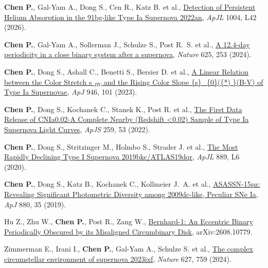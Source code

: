 
\item \textbf{Chen P.}, Gal-Yam A., Dong S., Cen R., Katz B. et al., \href{https://ui.adsabs.harvard.edu/abs/2026ApJ..1004L..42C}{Detection of Persistent Helium Absorption in the 91bg-like Type Ia Supernova 2022an}, \textit{ApJL} 1004, L42 (2026).

\item \textbf{Chen P.}, Gal-Yam A., Sollerman J., Schulze S., Post R.~S. et al., \href{https://ui.adsabs.harvard.edu/abs/2024Natur.625..253C}{A 12.4-day periodicity in a close binary system after a supernova}, \textit{Nature} 625, 253 (2024).

\item \textbf{Chen P.}, Dong S., Ashall C., Benetti S., Bersier D. et al., \href{https://ui.adsabs.harvard.edu/abs/2023ApJ...946..101C}{A Linear Relation between the Color Stretch s $_{ BV }$ and the Rising Color Slope \{s\}\_\{0\}(\{*) \}(B-V) of Type Ia Supernovae}, \textit{ApJ} 946, 101 (2023).

\item \textbf{Chen P.}, Dong S., Kochanek C., Stanek K., Post R. et al., \href{https://ui.adsabs.harvard.edu/abs/2022ApJS..259...53C}{The First Data Release of CNIa0.02-A Complete Nearby (Redshift <0.02) Sample of Type Ia Supernova Light Curves}, \textit{ApJS} 259, 53 (2022).

\item \textbf{Chen P.}, Dong S., Stritzinger M., Holmbo S., Strader J. et al., \href{https://ui.adsabs.harvard.edu/abs/2020ApJ...889L...6C}{The Most Rapidly Declining Type I Supernova 2019bkc/ATLAS19dqr}, \textit{ApJL} 889, L6 (2020).

\item \textbf{Chen P.}, Dong S., Katz B., Kochanek C., Kollmeier J.~A. et al., \href{https://ui.adsabs.harvard.edu/abs/2019ApJ...880...35C}{ASASSN-15pz: Revealing Significant Photometric Diversity among 2009dc-like, Peculiar SNe Ia}, \textit{ApJ} 880, 35 (2019).


\item Hu Z., Zhu W., \textbf{Chen P.}, Post R., Zang W., \href{https://ui.adsabs.harvard.edu/abs/2026arXiv260810779H}{Bernhard-1: An Eccentric Binary Periodically Obscured by its Misaligned Circumbinary Disk}, arXiv:2608.10779.

\item Zimmerman E., Irani I., \textbf{Chen P.}, Gal-Yam A., Schulze S. et al., \href{https://ui.adsabs.harvard.edu/abs/2024Natur.627..759Z}{The complex circumstellar environment of supernova 2023ixf}, \textit{Nature} 627, 759 (2024).

